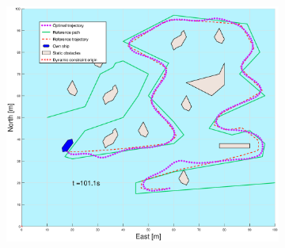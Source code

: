\begin{figure}[!b]
\begin{subfigure}[b]{0.49\textwidth}
    \end{subfigure}
    \hfill
    \begin{subfigure}[b]{0.499\textwidth}
        \centering
        \includegraphics[width=\textwidth]{Images/Figures/skjergard_u_trafikk/_Simple_1fig999_time=101}
    \end{subfigure}
    \hfill
\end{figure}%
